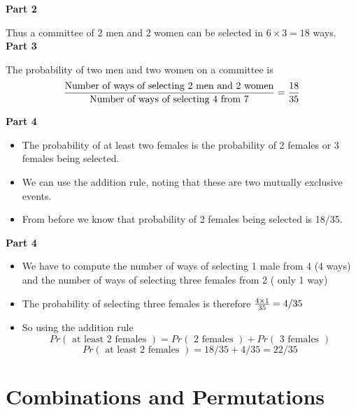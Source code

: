\documentclass[12pt]{report}
\begin{document}
	{\Large
		
		\textbf{Part 2}
		
		Thus a committee of 2 men and 2 women can be selected in $ 6 \times 3  = 18 $ ways.\\
		\bigskip
		\textbf{Part 3}
		
		The probability of two men and two women on a committee is
		\[ {\mbox{Number of ways of selecting 2 men and 2 women} \over \mbox{Number of ways of selecting 4 from 7}} = {18 \over 35 }\]
		
	}
	{\Large
		
		\textbf{Part 4}
		\begin{itemize}
			\item The probability of at least two females is the probability of 2 females or 3 females being selected.
			\item We can use the addition rule, noting that these are two mutually exclusive events.
			\item From before we know that probability of 2 females being selected is 18/35.
		\end{itemize}
		
	}
	{\Large
		
		\textbf{Part 4}
		\begin{itemize}
			\item We have to compute the number of ways of selecting 1 male from 4 (4 ways) and the number of ways of selecting three females from 2 ( only 1 way)
			\item The probability of selecting three females is therefore ${4 \times 1 \over 35} = 4/35$
			\item So using the addition rule
			\[ Pr(\mbox{ at least 2 females }) = Pr(\mbox{ 2 females }) + Pr(\mbox{ 3 females }) \]
			\[ Pr(\mbox{ at least 2 females })  = 18/35 + 4/35 = 22/35 \]
		\end{itemize}
		
	}
	
	
	
	\section{Combinations and Permutations }
\end{document}
